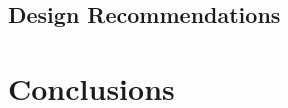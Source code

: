 \documentclass[manuscript,review]{acmart}
\begin{document}











\subsection{Design Recommendations}

\section{Conclusions}




\end{document}
